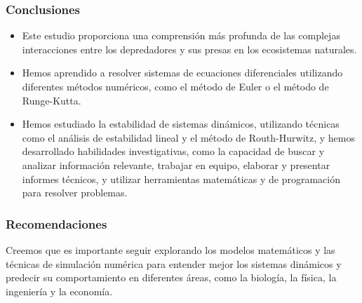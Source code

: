 \documentclass{beamer}
\begin{document}




\begin{frame}
	\frametitle{Conclusiones}
	\begin{minipage}{10cm}
	\begin{itemize}
		\item Este estudio proporciona una comprensi\'on más profunda de las complejas interacciones entre los depredadores y sus presas en
		los ecosistemas naturales.
		\item Hemos aprendido a resolver sistemas de ecuaciones diferenciales utilizando diferentes
		métodos numéricos, como el método de Euler o el método de Runge-Kutta.
		\item  Hemos estudiado
		la estabilidad de sistemas dinámicos, utilizando técnicas como el análisis de estabilidad lineal y el método de Routh-Hurwitz, y hemos
		desarrollado habilidades investigativas, como la capacidad de buscar y analizar información relevante, trabajar en equipo, elaborar y
		presentar informes técnicos, y utilizar herramientas matemáticas y de programación para resolver problemas.
	\end{itemize}	
	\end{minipage}
\end{frame}


\begin{frame}
	\frametitle{Recomendaciones}
	\begin{minipage}{10cm}
		Creemos que es importante seguir explorando los modelos matemáticos y las técnicas de simulación numérica para entender mejor
		los sistemas dinámicos y predecir su comportamiento en diferentes áreas, como la biología, la física, la ingeniería y
		la economía.
	\end{minipage}
\end{frame}
\end{document}
